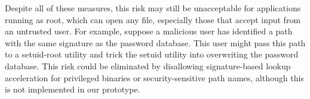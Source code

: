 

Despite all of these measures, 
this risk may still be unacceptable for applications running as root,
which can open any file,
especially those that accept input from an untrusted user.
For example, suppose a malicious user has identified
a path with the same signature as the password database.
This user  might pass this path to a setuid-root utility
and trick the setuid utility into overwriting 
the password database.
This risk could be eliminated by disallowing signature-based 
lookup acceleration for privileged binaries or security-sensitive path names,
although this is not implemented in our prototype.



